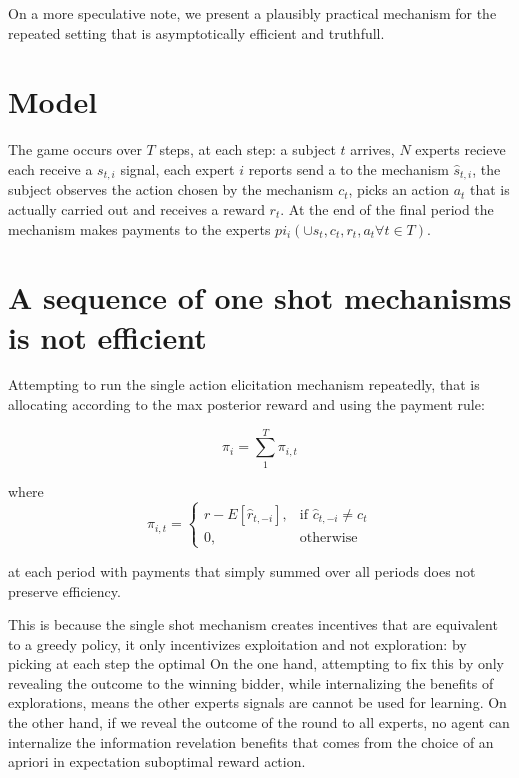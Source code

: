 On a more speculative note, we present a plausibly practical mechanism for the repeated setting that is asymptotically efficient and truthfull.




\section{Model}

The game occurs over $T$ steps, at each step: a subject $t$ arrives, $N$ experts recieve each receive a $s_{t,i}$ signal, each expert $i$ reports send a to the mechanism $\hat{s}_{t,i}$, the subject observes the action chosen by the mechanism $c_t$, picks an action $a_t$ that is actually carried out and receives a reward $r_t$.
At the end of the final period the mechanism makes payments to the experts $pi_i( \cup \hat{s}_t,c_t,r_t,a_t \forall t \in T)$.

\section{A sequence of one shot mechanisms is not efficient}

Attempting to run the single action elicitation mechanism repeatedly, that is allocating according to the max posterior reward and using the payment rule:

\[
    \pi_i = \sum_1^T \pi_{i,t} 
\]

where 
\[
    \pi_{i,t} =
\begin{cases}
    r - E[\hat{r}_{t,-i}] ,& \text{if } \hat{c}_{t,-i} \neq c_t\\
    0,              & \text{otherwise}
\end{cases}
\]

 at each period with payments that simply summed over all periods does not preserve efficiency.

This is because the single shot mechanism creates incentives that are equivalent to a greedy policy, it only incentivizes exploitation and not exploration: by picking at each step the optimal 
On the one hand, attempting to fix this by only revealing the outcome to the winning bidder, while internalizing the benefits of explorations, means the other experts signals are cannot be used for learning.
On the other hand, if we reveal the outcome of the round to all experts,  no agent can internalize the information revelation benefits that comes from the choice of an apriori in expectation suboptimal reward action. 

